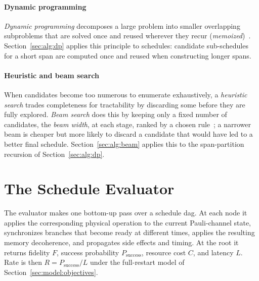 \vspace{0.5cm}

\paragraph{Dynamic programming} \emph{Dynamic programming} decomposes a large problem into smaller overlapping subproblems that are solved once and reused wherever they recur (\emph{memoized})~\cite{Bellman2003Dynamic}. Section~\ref{sec:alg:dp} applies this principle to schedules: candidate sub-schedules for a short span are computed once and reused when constructing longer spans.

\vspace{0.5cm}

\paragraph{Heuristic and beam search} When candidates become too numerous to enumerate exhaustively, a \emph{heuristic search} trades completeness for tractability by discarding some before they are fully explored. \emph{Beam search} does this by keeping only a fixed number of candidates, the \emph{beam width}, at each stage, ranked by a chosen rule~\cite{Lowerre1990HARPY,Huang2018When,Meister2022BestFirst}; a narrower beam is cheaper but more likely to discard a candidate that would have led to a better final schedule. Section~\ref{sec:alg:beam} applies this to the span-partition recursion of Section~\ref{sec:alg:dp}.

\clearpage

\section{The Schedule Evaluator}
\label{sec:alg:evaluator}


The evaluator makes one bottom-up pass over a schedule \Gls{dag}. At each node it applies the corresponding physical operation to the current Pauli-channel state, synchronizes branches that become ready at different times, applies the resulting memory decoherence, and propagates side effects and timing. At the root it returns fidelity $F$, success probability $P_{\mathrm{success}}$, resource cost $C$, and latency $L$. Rate is then $R=P_{\mathrm{success}}/L$ under the full-restart model of Section~\ref{sec:model:objectives}.


